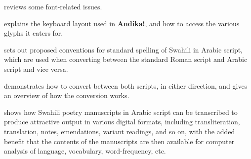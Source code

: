  reviews some font-related issues.

 explains the keyboard layout used in \textbf{Andika!}, and how to access the various glyphs it caters for.

 sets out proposed conventions for standard spelling of Swahili in Arabic script, which are used when converting between the standard Roman script and Arabic script and vice versa.

 demonstrates how to convert between both scripts, in either direction, and gives an overview of how the conversion works.

 shows how Swahili poetry manuscripts in Arabic script can be transcribed to produce attractive output in various digital formats, including transliteration, translation, notes, emendations, variant readings, and so on, with the added benefit that the contents of the manuscripts are then available for computer analysis of language, vocabulary, word-frequency, etc.
